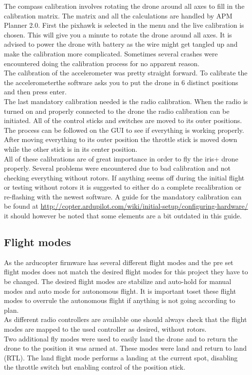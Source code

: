 The compass calibration involves rotating the drone around all axes to fill in the calibration
matrix. The matrix and all the calculations are handled by APM Planner 2.0. First the pixhawk is
selected in the menu and the live calibration is chosen. This will give you a minute to rotate the
drone around all axes. It is advised to power the drone with battery as the wire might get tangled
up and make the calibration more complicated. Sometimes several crashes were encountered doing the
calibration process for no apparent reason.\\

The calibration of the accelerometer was pretty straight forward. To calibrate the the
accelerometerthe software asks you to put the drone in 6 distinct positions and then press enter.\\

The last mandatory calibration needed is the radio calibration. When the radio is turned on and
properly connected to the drone the radio calibration can be initiated. All of the control sticks
and switches are moved to its outer positions. The process can be followed on the GUI to see if
everything is working properly. After moving everything to its outer position the throttle stick is
moved down while the other stick is in its center position.\\

All of these calibrations are of great importance in order to fly the iris+ drone properly. Several
problems were encountered due to bad calibration and not checking everything without rotors. If
anything seems off during the initial flight or testing without rotors it is suggested to either do
a complete recalibration or re-flashing with the newest software. A guide for the mandatory
calibration can be found at
\url{http://copter.ardupilot.com/wiki/initial-setup/configuring-hardware/} it should however be
noted that some elements are a bit outdated in this guide.

\subsection*{Flight modes}
As the arducopter firmware has several different flight modes and the pre set flight modes does not
match the desired flight modes for this project they have to be changed. The desired flight modes
are stabilize and auto-hold for manual modes and auto mode for autonomous flight. It is important
toset these flight modes to overrule the autonomous flight if anything is not going according to
plan.\\
As different radio controllers are available one should always check that the flight modes are
mapped to the used controller as desired, without rotors.\\
Two additional fly modes were used to easily land the drone and to return the drone to the position
it was armed at. These modes were land and return to land (RTL). The land flight mode performs a
landing at the current spot, disabling the throttle switch but enabling control of the position
stick.\\

